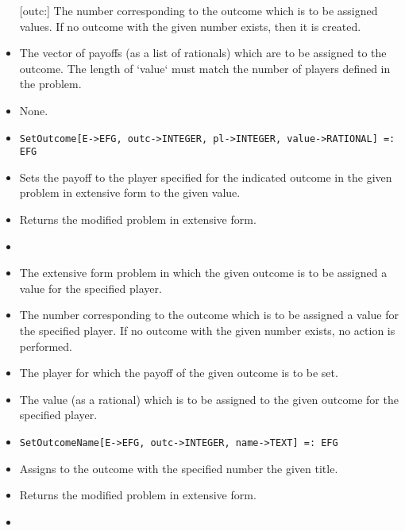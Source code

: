 \begin{itemize}
[outc:] The number corresponding to the outcome which is to be
assigned values.  If no outcome with the given number exists, then it
is created.
\item
[value:] The vector of payoffs (as a list of rationals) which are to
be assigned to the outcome.  The length of `value` must match the
number of players defined in the problem.
\ed

\item
[Optional parameters:] None.
\ed

\item

\protect \large \begin{verbatim} 
SetOutcome[E->EFG, outc->INTEGER, pl->INTEGER, value->RATIONAL] =: EFG
\end{verbatim}\normalsize

\bd
\item
[Description:] Sets the payoff to the player specified for the
indicated outcome in the given problem in extensive form to the given
value.
\item
[Return value:] Returns the modified problem in extensive form.
\item
[Required parameters:]\hfil\null
	
\bd
\item
[E:] The extensive form problem in which the given outcome is to be
assigned a value for the specified player.
\item
[outc:] The number corresponding to the outcome which is to be
assigned a value for the specified player.  If no outcome with the
given number exists, no action is performed.
\item
[pl:] The player for which the payoff of the given outcome is to be
set.
\item
[value:] The value (as a rational) which is to be assigned to the
given outcome for the specified player.
\ed
\ed

\item

\protect \large \begin{verbatim}
SetOutcomeName[E->EFG, outc->INTEGER, name->TEXT] =: EFG
\end{verbatim}\normalsize

\bd
\item
[Description:] Assigns to the outcome with the specified number the
given title.
\item
[Return value:] Returns the modified problem in extensive form.
\item
[Required parameters:]\hfil\null
	

\end{itemize}
